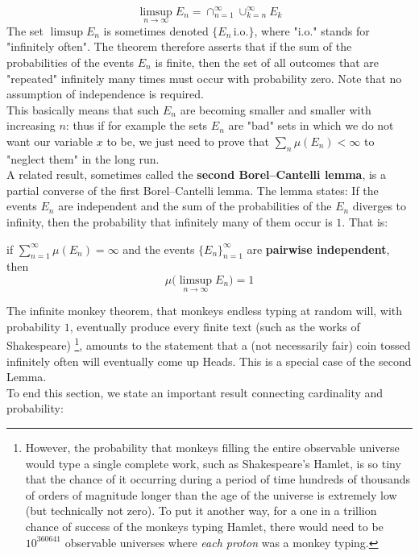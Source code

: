 \begin{equation*}
    \limsup_{n \rightarrow \infty} E_n = \cap_{n=1}^\infty \cup_{k=n}^\infty E_k
\end{equation*}
The set $\limsup E_n$ is sometimes denoted $\{E_n \, \text{i.o.} \}$, where "i.o." stands for "infinitely often". The theorem therefore asserts that if the sum of the probabilities of the events $E_n$ is finite, then the set of all outcomes that are "repeated" infinitely many times must occur with probability zero. Note that no assumption of independence is required.
\\This basically means that such $E_n$ are becoming smaller and smaller with increasing $n$: thus if for example the sets $E_n$ are "bad" sets in which we do not want our variable $x$ to be, we just need to prove that $\sum_n \mu(E_n) < \infty$ to "neglect them" in the long run. 
\\A related result, sometimes called the \textbf{second Borel–Cantelli lemma}, is a partial converse of the first Borel–Cantelli lemma. The lemma states: If the events $E_n$ are independent and the sum of the probabilities of the $E_n$ diverges to infinity, then the probability that infinitely many of them occur is $1$. That is:
\begin{lemma}
    if $\sum_{n=1}^\infty \mu(E_n) = \infty$ and the events $\{ E_n \}_{n=1}^\infty$ are \textbf{pairwise independent}, then 
    \begin{equation*}
        \mu \big( \limsup_{n \rightarrow \infty} E_n \big) = 1
    \end{equation*}
\end{lemma}
The infinite monkey theorem, that monkeys endless typing at random will, with probability $1$, eventually produce every finite text (such as the works of Shakespeare) \footnote{However, the probability that monkeys filling the entire observable universe would type a single complete work, such as Shakespeare's Hamlet, is so tiny that the chance of it occurring during a period of time hundreds of thousands of orders of magnitude longer than the age of the universe is extremely low (but technically not zero). To put it another way, for a one in a trillion chance of success of the monkeys typing Hamlet, there would need to be $10^{360641}$ observable universes where \textit{each proton} was a monkey typing.}, amounts to the statement that a (not necessarily fair) coin tossed infinitely often will eventually come up Heads. This is a special case of the second Lemma.
\\To end this section, we state an important result connecting cardinality and probability:
